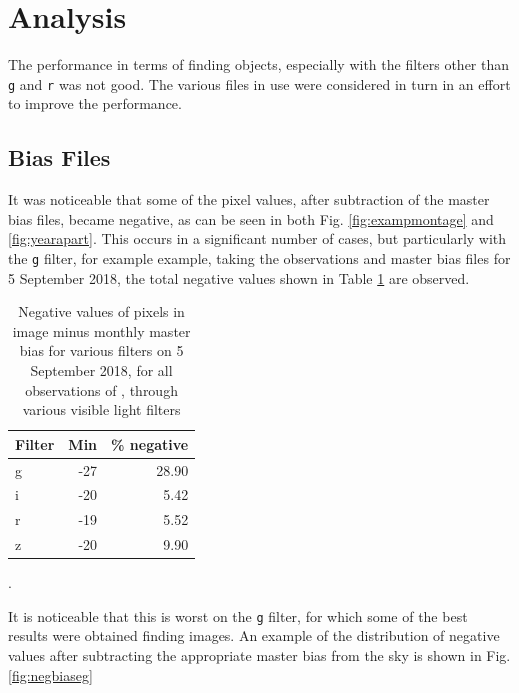 \section{Analysis}
\protect\label{section:tanalysis}

The performance in terms of finding objects, especially with the filters other
than \texttt{g} and \texttt{r} was not good. The various files in use were
considered in turn in an effort to improve the performance.

\subsection{Bias Files}
\protect\label{section:biasfiles}

It was noticeable that some of the pixel values, after subtraction of the master
bias files, became negative, as can be seen in both Fig. \ref{fig:exampmontage}
and \ref{fig:yearapart}. This occurs in a significant number of cases, but
particularly with the \texttt{g} filter, for example example, taking the
observations and master bias files for 5  September 2018, the total negative values shown in 
Table \ref{table:negmast} are
observed.

\begin{table}[!htbp]
\begin{center}
\begin{tabular}{lrr} \hline
Filter & Min & \% negative \\\hline
g & -27 & 28.90 \\
i & -20 & 5.42 \\
r & -19 & 5.52 \\
z & -20 & 9.90 \\
\hline
\end{tabular}
\end{center}
\caption{Negative values of pixels in image minus monthly master bias for
various filters on 5 September 2018, for all observations of \bstar, through
various visible light filters}.
\protect\label{table:negmast}
\end{table}

It is noticeable that this is worst on the \texttt{g} filter, for which some of
the best results were obtained finding images. An example of the distribution of
negative values after subtracting the appropriate master bias from the sky is
shown in Fig.
\ref{fig:negbiaseg}

